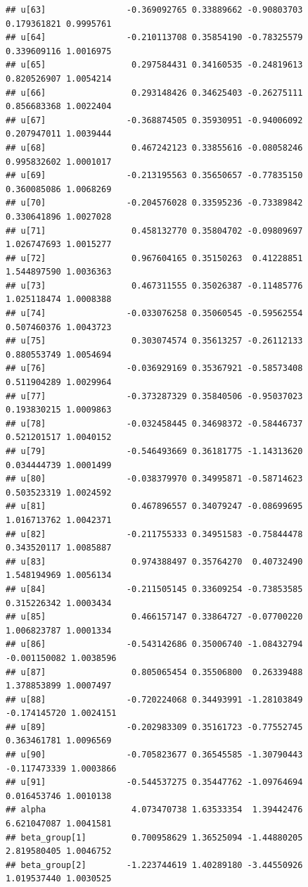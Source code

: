 \documentclass[
]{book}
\begin{document}
\begin{verbatim}
## u[63]                -0.369092765 0.33889662 -0.90803703  0.179361821 0.9995761
## u[64]                -0.210113708 0.35854190 -0.78325579  0.339609116 1.0016975
## u[65]                 0.297584431 0.34160535 -0.24819613  0.820526907 1.0054214
## u[66]                 0.293148426 0.34625403 -0.26275111  0.856683368 1.0022404
## u[67]                -0.368874505 0.35930951 -0.94006092  0.207947011 1.0039444
## u[68]                 0.467242123 0.33855616 -0.08058246  0.995832602 1.0001017
## u[69]                -0.213195563 0.35650657 -0.77835150  0.360085086 1.0068269
## u[70]                -0.204576028 0.33595236 -0.73389842  0.330641896 1.0027028
## u[71]                 0.458132770 0.35804702 -0.09809697  1.026747693 1.0015277
## u[72]                 0.967604165 0.35150263  0.41228851  1.544897590 1.0036363
## u[73]                 0.467311555 0.35026387 -0.11485776  1.025118474 1.0008388
## u[74]                -0.033076258 0.35060545 -0.59562554  0.507460376 1.0043723
## u[75]                 0.303074574 0.35613257 -0.26112133  0.880553749 1.0054694
## u[76]                -0.036929169 0.35367921 -0.58573408  0.511904289 1.0029964
## u[77]                -0.373287329 0.35840506 -0.95037023  0.193830215 1.0009863
## u[78]                -0.032458445 0.34698372 -0.58446737  0.521201517 1.0040152
## u[79]                -0.546493669 0.36181775 -1.14313620  0.034444739 1.0001499
## u[80]                -0.038379970 0.34995871 -0.58714623  0.503523319 1.0024592
## u[81]                 0.467896557 0.34079247 -0.08699695  1.016713762 1.0042371
## u[82]                -0.211755333 0.34951583 -0.75844478  0.343520117 1.0085887
## u[83]                 0.974388497 0.35764270  0.40732490  1.548194969 1.0056134
## u[84]                -0.211505145 0.33609254 -0.73853585  0.315226342 1.0003434
## u[85]                 0.466157147 0.33864727 -0.07700220  1.006823787 1.0001334
## u[86]                -0.543142686 0.35006740 -1.08432794 -0.001150082 1.0038596
## u[87]                 0.805065454 0.35506800  0.26339488  1.378853899 1.0007497
## u[88]                -0.720224068 0.34493991 -1.28103849 -0.174145720 1.0024151
## u[89]                -0.202983309 0.35161723 -0.77552745  0.363461781 1.0096569
## u[90]                -0.705823677 0.36545585 -1.30790443 -0.117473339 1.0003866
## u[91]                -0.544537275 0.35447762 -1.09764694  0.016453746 1.0010138
## alpha                 4.073470738 1.63533354  1.39442476  6.621047087 1.0041581
## beta_group[1]         0.700958629 1.36525094 -1.44880205  2.819580405 1.0046752
## beta_group[2]        -1.223744619 1.40289180 -3.44550926  1.019537440 1.0030525

\end{verbatim}
\end{document}
